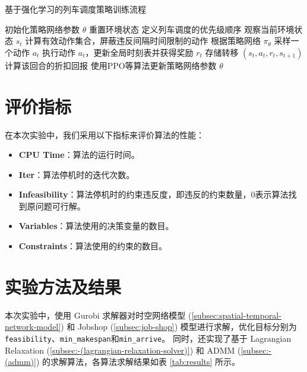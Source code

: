 \documentclass{article}
\begin{document}
\begin{algorithm}[h]
    \caption{基于强化学习的列车调度策略训练流程}
    \label{alg:train_schedule}
    \begin{algorithmic}[1]
        \State 初始化策略网络参数 $\theta$
        \Repeat
        \State 重置环境状态
        \State 定义列车调度的优先级顺序
        \State 观察当前环境状态 $s_t$
        \State 计算有效动作集合，屏蔽违反间隔时间限制的动作
        \State 根据策略网络 $\pi_\theta$ 采样一个动作 $a_t$
        \State 执行动作 $a_t$，更新全局时刻表并获得奖励 $r_t$
        \State 存储转移 $(s_t, a_t, r_t, s_{t+1})$
        \EndFor
        \State 计算该回合的折扣回报
        \State 使用PPO等算法更新策略网络参数 $\theta$
    \end{algorithmic}
\end{algorithm}

\section{评价指标}
在本次实验中，我们采用以下指标来评价算法的性能：
\begin{itemize}
    \item \textbf{CPU Time}：算法的运行时间。
    \item \textbf{Iter}：算法停机时的迭代次数。
    \item \textbf{Infeasibility}：算法停机时的约束违反度，即违反的约束数量，$0$表示算法找到原问题可行解。
    \item \textbf{Variables}：算法使用的决策变量的数目。
    \item \textbf{Constraints}：算法使用的约束的数目。
\end{itemize}

\section{实验方法及结果}
本次实验中，使用 Gurobi
求解器对时空网络模型 (\ref{subsec:spatial-temporal-network-model}) 和 Jobshop
(\ref{subsec:job-shop})
模型进行求解，优化目标分别为\texttt{feasibility}、\texttt{min\_makespan}和\texttt{min\_arrive}。
同时，还实现了基于 Lagrangian
Relaxation (\ref{subsec:-(lagrangian-relaxation-solver)}) 和 ADMM
(\ref{subsec:-(admm)}) 的求解算法，各算法求解结果如表 \ref{tab:results} 所示。
\end{document}
